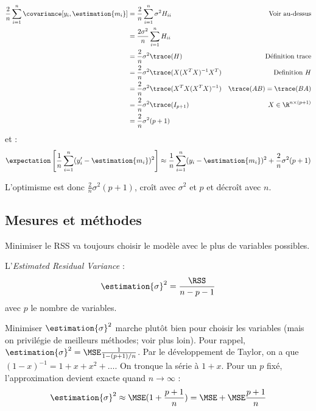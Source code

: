 \begin{exemple}
            \begin{align*}
                \frac{2}{n} \sum_{i=1}^n \covariance[y_i, \estimation{m_i}] &= \frac{2}{n} \sum_{i=1}^n \sigma^2 H_{ii} & \text{Voir au-dessus}\\
                &= \frac{2\sigma^2}{n} \sum_{i=1}^n H_{ii}\\
                &= \frac{2}{n} \sigma^2 \trace(H) & \text{Définition trace}\\
                &= \frac{2}{n} \sigma^2 \trace(X (X^T X)^{-1} X^T) & \text{Definition \(H\)}\\
                &= \frac{2}{n} \sigma^2 \trace(X^T X (X^T X)^{-1}) & \trace(AB) = \trace(BA)\\
                &= \frac{2}{n} \sigma^2 \trace(I_{p+1}) & X \in \R^{n \times (p + 1)}\\
                &= \frac{2}{n} \sigma^2 (p + 1)
            \end{align*}
            et :
            \[
                \expectation\left[\frac{1}{n} \sum_{i=1}^n (y_i' - \estimation{m_i})^2\right] \approx \frac{1}{n} \sum_{i=1}^n (y_i - \estimation{m_i})^2 + \frac{2}{n} \sigma^2 (p + 1)
            \]

            L'optimisme est donc \(\frac{2}{n} \sigma^2 (p + 1)\), croît avec \(\sigma^2\) et \(p\) et décroît avec \(n\).
        \end{exemple}

    \subsection{Mesures et méthodes}
        Minimiser le RSS va toujours choisir le modèle avec le plus de variables possibles.

        \begin{definition}
            L'\textit{Estimated Residual Variance} :
            \[
                \estimation{\sigma}^2 = \frac{\RSS}{n - p -1}
            \]
            avec \(p\) le nombre de variables.
        \end{definition}

        Minimiser \(\estimation{\sigma}^2\) marche plutôt bien pour choisir les variables (mais on privilégie de meilleurs méthodes; voir plus loin). Pour rappel, \(\estimation{\sigma}^2 = \MSE \frac{1}{1 - (p + 1)/n}\). Par le développement de Taylor, on a que \((1 - x)^{-1} = 1 + x + x^2 + \dots\). On tronque la série à \(1 + x\). Pour un \(p\) fixé, l'approximation devient exacte quand \(n \to \infty\) :
        \[
            \estimation{\sigma}^2 \approx \MSE (1 + \frac{p + 1}{n}) = \MSE + \MSE\frac{p + 1}{n}
        \]

